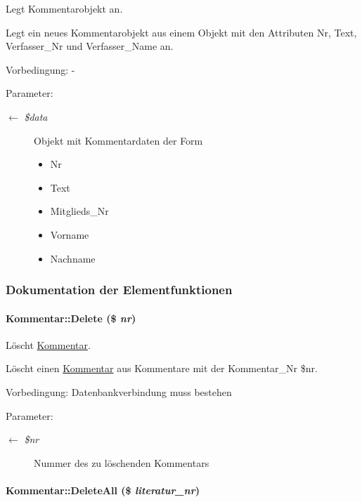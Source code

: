 Legt Kommentarobjekt an. 

Legt ein neues Kommentarobjekt aus einem Objekt mit den Attributen Nr, Text, Verfasser\_\-Nr und Verfasser\_\-Name an. \begin{Desc}
\item[Vorbedingung:]- \end{Desc}
\begin{Desc}
\item[Parameter:]
\begin{description}
\item[\mbox{$\leftarrow$} {\em \$data}]Objekt mit Kommentardaten der Form\begin{itemize}
\item Nr\item Text\item Mitglieds\_\-Nr\item Vorname\item Nachname\end{itemize}
\end{description}
\end{Desc}


\subsubsection{Dokumentation der Elementfunktionen}
\hypertarget{classKommentar_31c1fdfb4fb8f24e0016c8ddb98ddcdc}{
\paragraph[Delete]{\setlength{\rightskip}{0pt plus 5cm}Kommentar::Delete (\$ {\em nr})}\hfill}
\label{classKommentar_31c1fdfb4fb8f24e0016c8ddb98ddcdc}


Löscht \hyperlink{classKommentar}{Kommentar}. 

Löscht einen \hyperlink{classKommentar}{Kommentar} aus Kommentare mit der Kommentar\_\-Nr \$nr. \begin{Desc}
\item[Vorbedingung:]Datenbankverbindung muss bestehen \end{Desc}
\begin{Desc}
\item[Parameter:]
\begin{description}
\item[\mbox{$\leftarrow$} {\em \$nr}]Nummer des zu löschenden Kommentars\end{description}
\end{Desc}
\hypertarget{classKommentar_9903f1df98f71eefa3b44a81d6a8ee5c}{
\paragraph[DeleteAll]{\setlength{\rightskip}{0pt plus 5cm}Kommentar::Delete\-All (\$ {\em literatur\_\-nr})}\hfill}
\label{classKommentar_9903f1df98f71eefa3b44a81d6a8ee5c}


